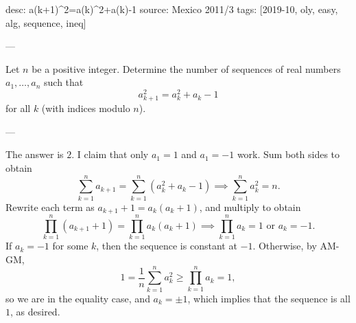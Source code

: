 desc: a(k+1)^2=a(k)^2+a(k)-1
source: Mexico 2011/3
tags: [2019-10, oly, easy, alg, sequence, ineq]

---

Let $n$ be a positive integer. Determine the number of sequences of real numbers $a_1,\ldots,a_n$ such that \[a_{k+1}^2=a_k^2+a_k-1\]
for all $k$ (with indices modulo $n$).

---

The answer is $2$. I claim that only $a_1=1$ and $a_1=-1$ work. Sum both sides to obtain \[\sum_{k=1}^na_{k+1}=\sum_{k=1}^n \left(a_k^2+a_k-1\right)\implies\sum_{k=1}^na_k^2=n.\]
Rewrite each term as $a_{k+1}+1=a_k(a_k+1)$, and multiply to obtain \[\prod_{k=1}^n (a_{k+1}+1)=\prod_{k=1}^na_k(a_k+1)\implies \prod_{k=1}^na_k=1\text{ or }a_k=-1.\]
If $a_k=-1$ for some $k$, then the sequence is constant at $-1$. Otherwise, by AM-GM, \[1=\frac1n\sum_{k=1}^na_k^2\ge\prod_{k=1}^na_k=1,\]
so we are in the equality case, and $a_k=\pm 1$, which implies that the sequence is all $1$, as desired.
